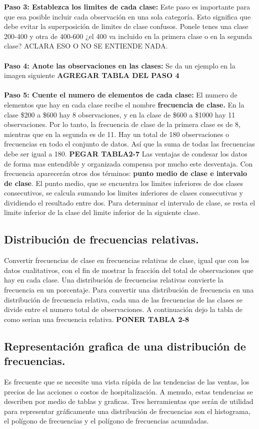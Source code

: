 \documentclass[]{article}
\begin{document}
\textbf{Paso 3: Establezca los limites de cada clase:} Este paso es importante para que esa posible incluir cada observación en una sola categoría. Esto significa que debe evitar la superposición de limites de clase confusos. Ponele tenes una clase 200-400 y otra de 400-600 ¿el 400 va incluido en la primera clase o en la segunda clase? ACLARA ESO O NO SE ENTIENDE NADA.\\\\
\textbf{Paso 4: Anote las observaciones en las clases:} Se da un ejemplo en la imagen siguiente \textbf{AGREGAR TABLA DEL PASO 4}\\\\
\textbf{Paso 5: Cuente el numero de elementos de cada clase:} El numero de elementos que hay en cada clase recibe el nombre \textbf{frecuencia de clase.} En la clase \$200 a \$600 hay 8 observaciones, y en la clase de \$600 a \$1000 hay 11 observaciones. Por lo tanto, la frecuencia de clase de la primera clase es de 8, mientras que en la segunda es de 11. Hay un total de 180 observaciones o frecuencias en todo el conjunto de datos. Así que la suma de todas las frecuencias debe ser igual a 180. \textbf{PEGAR TABLA2-7}
Las ventajas de condesar los datos de forma mas entendible y organizada compensa por mucho este desventaja. \linebreak[2]
Con frecuencia aparecerán otros dos términos: \textbf{punto medio de clase e intervalo de clase}. El punto medio, que se encuentra los limites inferiores de dos clases consecutivos, se calcula sumando los limites inferiores de clases consecutivas y dividiendo el resultado entre dos. Para determinar el intervalo de clase, se resta el limite inferior de la clase del limite inferior de la siguiente clase.
\subsection{Distribución de frecuencias relativas.}
Convertir frecuencias de clase en frecuencias relativas de clase, igual que con los datos cualitativos, con el fin de mostrar la fracción del total de observaciones que hay en cada clase. Una distribución de frecuencias relativas convierte la frecuencia en un porcentaje. Para convertir una distribución de frecuencia en una distribución de frecuencia relativa, cada una de las frecuencias de las clases se divide entre el numero total de observaciones. A continuación dejo la tabla de como serian una frecuencia relativa. \textbf{PONER TABLA 2-8}
\subsection{Representación grafica de una distribución de frecuencias.}
Es frecuente que se necesite una vista rápida de las tendencias de las ventas, los precios de las acciones o costos de hospitalización. A menudo, estas tendencias se describen por medio de tablas y graficas. Tres herramientas que serán de utilidad para representar gráficamente una distribución de frecuencias son el histograma, el polígono de frecuencias y el polígono de frecuencias acumuladas.
\end{document}
